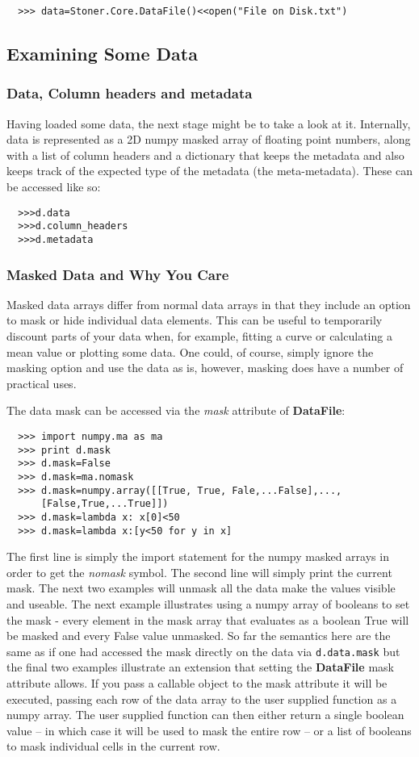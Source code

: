 \documentclass[a4paper,11pt]{scrartcl}
\begin{document}
\begin{verbatim}
  >>> data=Stoner.Core.DataFile()<<open("File on Disk.txt")
\end{verbatim}

\subsection{Examining Some Data}
\subsubsection{Data, Column headers and metadata}
Having loaded some data, the next stage might be to take a look at it.
Internally, data is represented as a 2D numpy masked array of floating point numbers,
along with a list of column headers and a dictionary that keeps the metadata and
also keeps track of the expected type of the metadata (\ie the meta-metadata).
These can be accessed like so:
\begin{verbatim}
  >>>d.data
  >>>d.column_headers
  >>>d.metadata
\end{verbatim}

\subsubsection{Masked Data and Why You Care}
Masked data arrays differ from normal data arrays in that they include an option to mask or hide individual data elements. This can be useful to temporarily discount parts of your data when, for example, fitting a curve or calculating a mean value or plotting some data. One could, of course, simply ignore the masking option and use the data as is, however, masking does have a number of practical uses.

The data mask can be accessed via the \textit{mask} attribute of \textbf{DataFile}:
\begin{verbatim}
  >>> import numpy.ma as ma
  >>> print d.mask
  >>> d.mask=False
  >>> d.mask=ma.nomask
  >>> d.mask=numpy.array([[True, True, Fale,...False],...,
      [False,True,...True]])
  >>> d.mask=lambda x: x[0]<50
  >>> d.mask=lambda x:[y<50 for y in x]
\end{verbatim}

The first line is simply the import statement for the numpy masked arrays in order to get the \textit{nomask} symbol. The second line will simply print the current mask. The next two examples will unmask all the data \ie make the values visible and useable. The next example illustrates using a numpy array of booleans to set the mask - every element in the mask array that evaluates as a boolean True will be masked and every False value unmasked. So far the semantics here are the same as if one had accessed the mask directly on the data via \verb'd.data.mask' but the final two examples illustrate an extension that setting the \textbf{DataFile} mask attribute allows. If you pass a callable object to the mask attribute it will be executed, passing each row of the data array to the user supplied function as a numpy array. The user supplied function can then either return a single boolean value -- in which case it will be used to mask the entire row -- or a list of booleans to mask individual cells in the current row.
\end{document}
